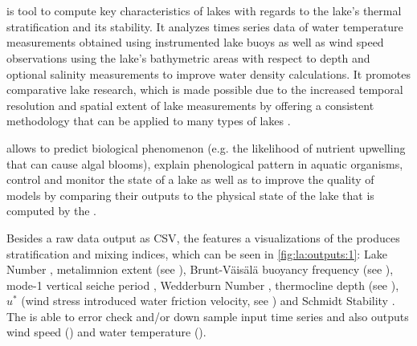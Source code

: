 \chapter{\la}
	\la is tool to compute key characteristics of lakes with regards to the lake's thermal stratification and its stability. It analyzes times series data of water temperature measurements obtained using instrumented lake buoys as well as wind speed observations using the lake's bathymetric areas with respect to depth and optional salinity measurements to improve water density calculations. It promotes comparative lake research, which is made possible due to the increased temporal resolution and spatial extent of lake measurements by offering a consistent methodology that can be applied to many types of lakes \citep{read2011derivation}.

	\la allows to predict biological phenomenon (e.g. the likelihood of nutrient upwelling that can cause algal blooms), explain phenological pattern in aquatic organisms, control and monitor the state of a lake as well as to improve the quality of models by comparing their outputs to the physical state of the lake that is computed by the \la.

	Besides a raw data output as \ac{CSV}, the \la features a visualizations of the produces stratification and mixing indices, which can be seen in \cref{fig:la:outputs:1}: Lake Number \citep[see ,][]{imberger1990}, metalimnion extent (see ), Brunt-Väisälä buoyancy frequency (see ), mode-1 vertical seiche period \citep[see ,][]{monismith1986}, Wedderburn Number \citep[see ,][]{thompson1980}, thermocline depth (see ), $u^{*}$ (wind stress introduced water friction velocity, see ) and Schmidt Stability \citep[see ,][]{schmidt1928,hutchinson1957,idso1973}. The \la is able to error check and/or down sample input time series and also outputs wind speed () and water temperature ().

